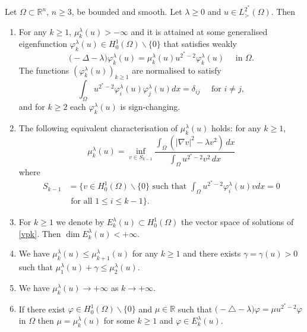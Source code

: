 \documentclass[10pt,a4paper]{amsart}
\newcommand{\Om}{\Omega}
\newcommand{\R}{\mathbb{R}}
\newcommand{\mkl}{\mu_{k}^{\lambda}}
\newcommand{\vil}{\varphi_{i}^{\lambda}}
\newcommand{\vjl}{\varphi_{j}^{\lambda}}
\newcommand{\vkl}{\varphi_{k}^{\lambda}}
\newcommand{\vp}{\varphi}
\begin{document}
\begin{prop} \label{prop:vp}
Let $\Om \subset \R^n$, $n \ge 3$, be bounded and smooth. Let $\lambda \ge0$ and $u \in L^{2^*}_>(\Om)$. Then
\begin{enumerate}
\item For any $k \ge 1$, $\mkl(u)> - \infty$ and it is attained at some generalised eigenfunction $\vkl(u) \in H^1_0(\Om) \backslash \{0\}$ that satisfies weakly
\begin{equation} \label{vpk}
\big( - \Delta - \lambda \big) \vkl(u) = \mu_{k}^{\lambda}(u) u^{2^*-2}    \vkl(u) \quad \text{ in } \Om.
\end{equation}
The functions $(\vkl(u))_{k \ge 1}$ are normalised to satisfy
\begin{equation} \label{norma} 
\int_\Om u^{2^*-2} \vil(u) \vjl(u) dx =  \delta_{ij} \quad \text{ for } i \neq j,
\end{equation}
and for $k \ge 2$ each $\vkl(u)$ is sign-changing. 
\item The following equivalent characterisation of $\mkl(u)$ holds: for any $k \ge 1$,
\begin{equation} \label{muk2}
\mkl(u) = \inf_{v \in S_{k-1}} \frac{\int_{\Om}\left(  |\nabla v|^2 - \lambda v^2 \right) \, dx}{\int_{\Om} u^{2^*-2} v^2 \, dx} 
\end{equation}
where 
$$\begin{aligned} 
S_{k-1} & = \Big\{ v \in H^1_0(\Om)  \backslash \{0\} \text{ such that } \int_\Om u^{2^*-2} \vil(u) v dx = 0 \\
&\text{ for all } 1 \le i \le k-1 \Big\}.
\end{aligned} $$
\item For $k \ge 1$ we denote by $E_k^{\lambda}(u) \subset H^1_0(\Om)$ the vector space of solutions of \eqref{vpk}. Then $\dim E_k^{\lambda}(u) < + \infty$.

\item We have $\mkl(u) \le \mu_{k+1}^{\lambda}(u)$ for any $k \ge 1$ and there exists $\gamma = \gamma (u) >0$ such that $ \mu_1^{\lambda}(u) + \gamma \le \mu_{2}^{\lambda}(u)$.
\item We have $\mkl(u) \to + \infty$ as $k \to + \infty$. 
\item If there exist $\vp \in H^1_0(\Om) \backslash \{0\}$ and $\mu \in \R$ such that $\big( - \triangle - \lambda \big) \vp = \mu u^{2^*-2} \vp$ in  $\Om$ then $\mu =\mkl(u)$ for some $k \ge 1$ and $\vp \in E_k^{\lambda}(u)$. 

 \end{enumerate}
\end{prop}
\end{document}
